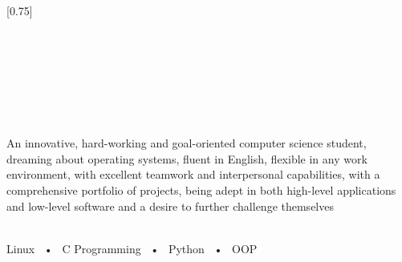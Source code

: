 \documentclass[lighthipster]{simplehipstercv}
\begin{document}
\setlength{\columnsep}{1cm}
[0.75]
\begin{paracol}{2}
 
\paracolbackgroundoptions
 
 
 
 
\footnotesize
{\setasidefontcolour
\flushright
\begin{center}
\end{center}
\begin{flushleft}
 
 \\[0.5em]
\\[0.5em]
\\[0.5em]
\\[0.5em]
\\[0.5em]
 
\bigskip
 
\\[0.5em]
 
{\footnotesize
An innovative, hard-working and goal-oriented computer science student, dreaming about operating systems, fluent
in English, flexible in any work environment, with excellent teamwork and interpersonal capabilities, with a comprehensive
portfolio of projects, being adept in both high-level applications and low-level software
and a desire to further challenge themselves}
\bigskip
 
 
 
 
 
\bigskip
 
 \\[0.5em]
 
Linux ~•~ C Programming ~•~ Python ~•~ OOP
 
\bigskip
 
 
 

\end{flushleft}}
\end{paracol}
\end{document}
